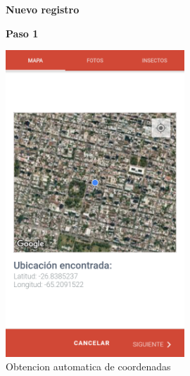 				\begin{figure}
					\hspace*{1cm}\raggedright\large\textbf{Nuevo registro}\par\medskip
					\centering
					\textbf{Paso 1}\par\medskip
					\includegraphics[width=0.6\textwidth]{Screenshots/registroPaso1.png}
					\caption{Obtencion automatica de coordenadas}
				\end{figure}
				
